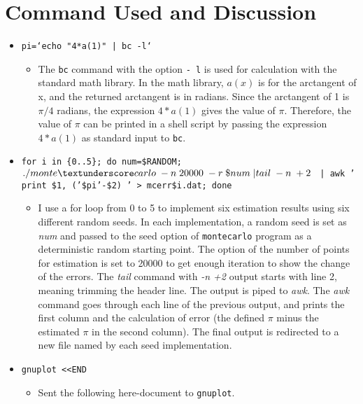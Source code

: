 \documentclass[12pt]{article}
\begin{document}


\section{Command Used and Discussion}

\begin{itemize}
   \item \texttt{pi=`echo "4*a(1)" | bc -l`}
   \begin{itemize}
     \item The \texttt{bc} command with the option \texttt{- l} is used for calculation with the standard math library. In the math library, $a(x)$ is for the arctangent of x, and the returned arctangent is in radians. Since the arctangent of 1 is $\pi /4$ radians, the expression $4*a(1)$ gives the value of $\pi$. Therefore, the value of $\pi$ can be printed in a shell script by passing the expression $4*a(1)$ as standard input to \texttt{bc}.
   \end{itemize}
   \item \texttt{for i in \{0..5\}; do num=\$RANDOM; $./monte\textunderscore carlo\; -n\; 20000\; -r\; \$num\; | tail\; -n\; +2\;$ | awk ' {print \$1, ('\$pi'-\$2)} ' > mc\textunderscore err\textunderscore \${i}.dat; done}
   \begin{itemize}
     \item I use a for loop from 0 to 5 to implement six estimation results using six different random seeds. In each implementation, a random seed is set as \textit{num} and passed to the seed option of \texttt{monte\textunderscore carlo} program as a deterministic random starting point. The option of the number of points for estimation is set to 20000 to get enough iteration to show the change of the errors. The \textit{tail} command with \textit{-n +2} output starts with line 2, meaning trimming the header line. The output is piped to \textit{awk}. The \textit{awk} command goes through each line of the previous output, and prints the first column and the calculation of error (the defined $\pi$ minus the estimated $\pi$ in the second column). The final output is redirected to a new file named by each seed implementation.
   \end{itemize}
   \item \texttt{gnuplot <\!<END}
   \begin{itemize}
     \item Sent the following here-document to \texttt{gnuplot}.
   \end{itemize}

\end{itemize}
\end{document}

